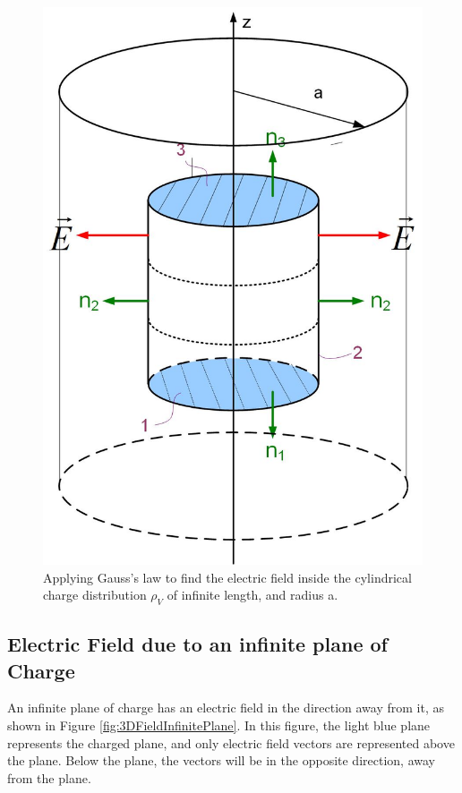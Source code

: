 \documentclass{ximera}
\begin{document}
\begin{figure}[htbp]
\begin{center}
\includegraphics[scale=0.3]{../jpg/gausslawwireInside.jpg}
\end{center}
\caption{Applying Gauss's law to find the electric field inside the  cylindrical charge distribution $\rho_V$ of infinite length, and radius a.}
\label{fig:gaussLineIn}
\end{figure}


\subsection{Electric Field due to an infinite plane of Charge}

An infinite plane of charge has an electric field in the direction away from it, as shown in Figure \ref{fig:3DFieldInfinitePlane}. In this figure, the light blue plane represents the charged plane, and only electric field vectors are represented above the plane. Below the plane, the vectors will be in the opposite direction, away from the plane. 
\end{document}
